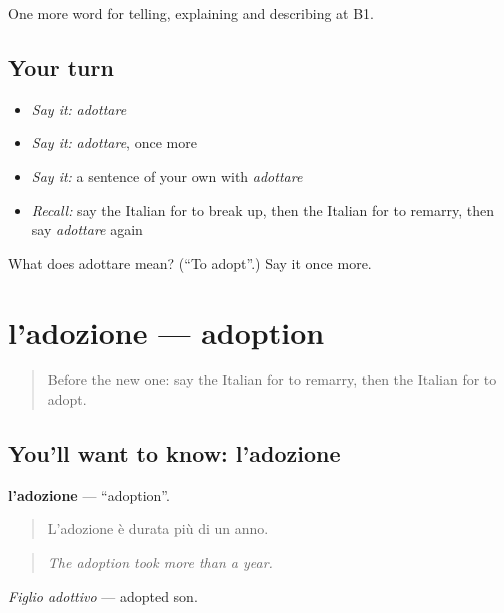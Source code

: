 \begin{grammarlens}[title={What you've built}]
One more word for telling, explaining and describing at B1.
\end{grammarlens}

\subsection*{Your turn}
\begin{itemize}
\raggedright
  \item \emph{Say it:} \emph{adottare}
  \item \emph{Say it:} \emph{adottare}, once more
  \item \emph{Say it:} a sentence of your own with \emph{adottare}
  \item \emph{Recall:} say the Italian for to break up, then the Italian for to remarry, then say \emph{adottare} again
\end{itemize}

\begin{tcolorbox}[breakable,colback=teal!4,colframe=teal!35!black,title={Before you move on}]
What does adottare mean? (\textquotedblleft{}To adopt\textquotedblright{}.) Say it once more.
\end{tcolorbox}
\section[l'adozione]{l'adozione — adoption}

\label{lesson:IT-C495-adozione}



\begin{quote}
Before the new one: say the Italian for to remarry, then the Italian for to adopt.
\end{quote}

\subsection*{You'll want to know: l'adozione}
\textbf{l'adozione} — \textquotedblleft{}adoption\textquotedblright{}.

\begin{quote}
L'adozione è durata più di un anno.
\end{quote}

\begin{quote}
\emph{The adoption took more than a year.}
\end{quote}

\emph{Figlio adottivo} — adopted son.

